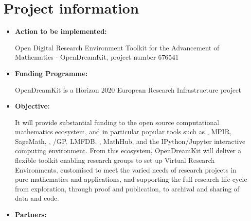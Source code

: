 \documentclass{deliverablereport}
\begin{document}
\section{Project information}
\begin{itemize}
\item\textbf{Action to be implemented:}


Open Digital Research Environment Toolkit for the Advancement of Mathematics - OpenDreamKit, project number 676541
\item\textbf{Funding Programme:}


OpenDreamKit is a Horizon 2020 European Research Infrastructure project 
\item\textbf{Objective:}


It will provide substantial funding to the open source computational mathematics ecosystem, and in particular popular tools such as \Linbox, MPIR, SageMath, \GAP, \Pari/GP, LMFDB, \Singular, MathHub, and the IPython/Jupyter interactive computing environment.
From this ecosystem, OpenDreamKit will deliver a flexible toolkit enabling research groups to set up Virtual Research Environments, customised to meet the varied needs of research projects in pure mathematics and applications, and supporting the full research life-cycle from exploration, through proof and publication, to archival and sharing of data and code.
\item\textbf{Partners:}



\end{itemize}
\end{document}
